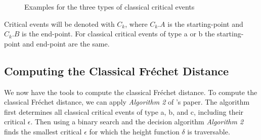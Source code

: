 \begin{figure}[H]
    \centering
    
    \qquad
    \qquad

	\caption{Examples for the three types of classical critical events}
    \label{fig:classical_critical_events}
\end{figure}

\addtocounter{footnote}{-3} %

Critical events will be denoted with $C_k$, where $C_k.A$ is the starting-point and $C_k.B$ is the end-point. For classical critical events of type a or b the starting-point and end-point are the same.


\subsection{Computing the Classical Fréchet Distance}

We now have the tools to compute the classical Fréchet distance. To compute the classical Fréchet distance, we can apply \textit{Algorithm 2} of \citeauthor*{altgodau}'s paper.\cite{altgodau} The algorithm first determines all classical critical events of type a, b, and c, including their critical $\epsilon$. Then using a binary search and the decision algorithm \textit{Algorithm 2} finds the smallest critical $\epsilon$ for which the height function $\delta$ is traversable.


